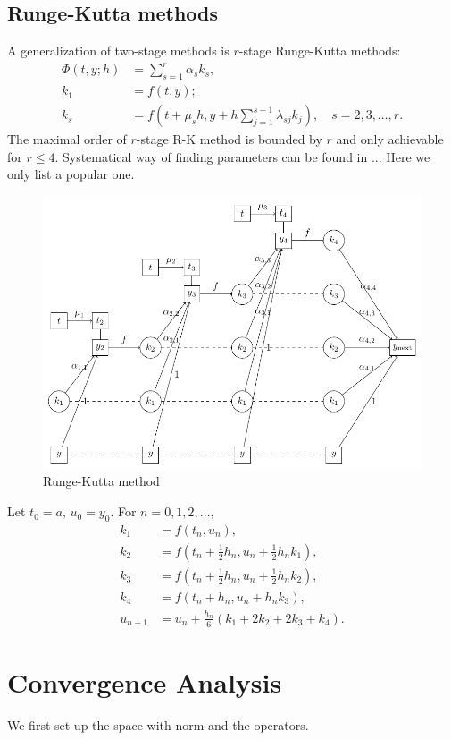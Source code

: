\documentclass[10pt]{amsart}
\begin{document}
\subsection{Runge-Kutta methods}
A generalization of two-stage methods is $r$-stage Runge-Kutta methods:
\begin{align*}
\Phi(t, y; h) &= \sum_{s=1}^r \alpha_s k_s,\\
k_1 &= f(t, y);\\
k_s & = f(t+\mu_s h, y + h \sum_{j=1}^{s-1}\lambda_{sj}k_j), \quad s = 2,3,\ldots, r.
\end{align*}
The maximal order of $r$-stage R-K method is bounded by $r$ and only achievable for $r\leq 4$. Systematical way of finding parameters can be found in ... Here we only list a popular one.

\begin{figure}[htbp]
\begin{center}
\includegraphics[width=4.6in]{figures/RKlatex.pdf}
\caption{Runge-Kutta method}
\label{fig:RK}
\end{center}
\end{figure}

\begin{tcolorbox}[colframe=black!15!white, coltitle=white!5!black, title = \bf The classical $4$-th order Runge-Kutta method]
Let $t_0=a,\, u_0 = y_0$. For $n=0,1,2,...,$
\begin{align*}
k_1 &= f(t_n, u_n),\\
k_2 & = f(t_n + \frac{1}{2}h_n, u_n + \frac{1}{2}h_n k_1),\\
k_3 & = f(t_n + \frac{1}{2}h_n, u_n + \frac{1}{2}h_n k_2),\\
k_4 & = f(t_n + h_n, u_n + h_n k_3),\\
u_{n+1} &= u_n +  \frac{h_n}{6}( k_1 + 2k_2 + 2k_3 + k_4).
\end{align*}
\end{tcolorbox}

\section{Convergence Analysis}
We first set up the space with norm and the operators. 
\end{document}
